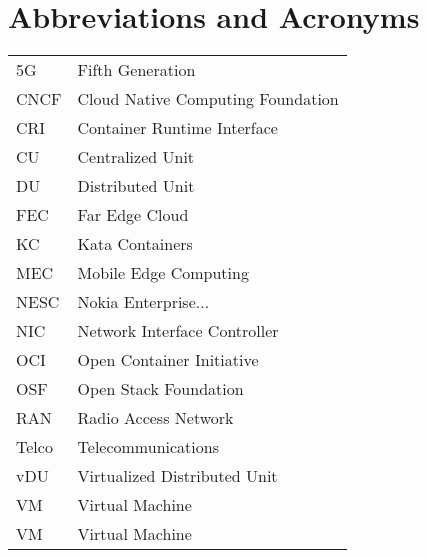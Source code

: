 \chapter*{Abbreviations and Acronyms}

\noindent
\begin{longtable}{@{}p{}p{}@{}}
5G & Fifth Generation \\
CNCF & Cloud Native Computing Foundation \\
CRI & Container Runtime Interface \\
CU & Centralized Unit \\
DU & Distributed Unit \\
FEC & Far Edge Cloud \\
KC & Kata Containers \\
MEC & Mobile Edge Computing \\
NESC & Nokia Enterprise... \\
NIC & Network Interface Controller \\
OCI & Open Container Initiative \\
OSF & Open Stack Foundation \\
RAN & Radio Access Network \\
Telco & Telecommunications \\
vDU & Virtualized Distributed Unit \\
VM & Virtual Machine \\
VM & Virtual Machine \\



\end{longtable}
